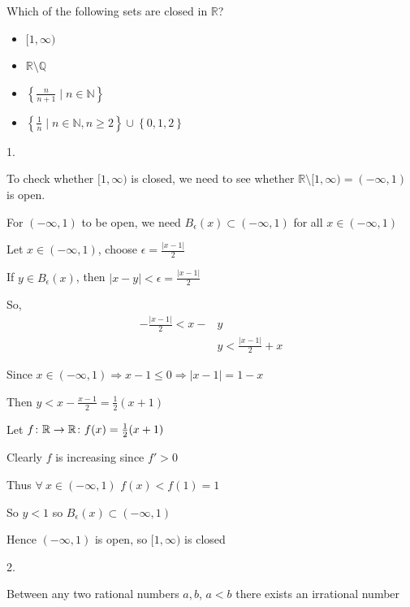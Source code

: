 \documentclass{article}
\begin{document}
\begin{problem}
Which of the following sets are closed in \( \mathbb{R} \)?
\begin{itemize}
	\item \( [1,\infty) \)
	\item \( \mathbb{R} \setminus \mathbb{Q} \)
	\item \( \left\{ \frac{n}{n+1} \mid n \in \mathbb{N} \right\}  \)
	\item \( \left\{ \frac{1}{n} \mid n \in \mathbb{N}, n \ge 2 \right\} \cup \left\{ 0,1,2 \right\}  \)
\end{itemize}

\begin{solution}1.

	To check whether \( [1,\infty) \) is closed, we need to see whether \( \mathbb{R}\setminus [1,\infty) = (-\infty,1) \) is open.


	For \( (-\infty,1) \) to be open, we need \( B_{\epsilon}(x) \subset (-\infty,1) \) for all \( x \in (-\infty,1) \)

	Let \( x \in (-\infty,1) \), choose \( \epsilon = \frac{|x-1|}{2} \)

	If \( y \in B_{\epsilon}(x) \), then \( |x-y| < \epsilon = \frac{|x-1|}{2} \)

	So,
	\begin{align*}
		-\frac{|x-1|}{2} < x- & y                       \\
		                      & y < \frac{|x-1|}{2} + x
	\end{align*}

	Since \( x \in (-\infty,1) \Rightarrow x-1 \le 0 \Rightarrow |x-1| = 1 - x\)

	Then \( y < x - \frac{x-1}{2} = \frac{1}{2}(x + 1) \)

	Let \( f \colon \mathbb{R} \to \mathbb{R} \colon f(x) = \frac{1}{2}(x+1)  \)

	Clearly \( f \) is increasing since \( f' > 0 \)

	Thus \( \forall \ x \in (-\infty,1) \) \( f(x) < f(1) = 1 \)

	So \( y < 1 \) so \( B_{\epsilon}(x) \subset (-\infty,1)\)

	Hence \( (-\infty,1) \) is open, so \( [1,\infty) \) is closed
\end{solution}

\begin{solution} 2.

	\begin{lemma}
		Between any two rational numbers \( a, b \), \( a < b \) there exists an irrational number


\end{lemma}
\end{solution}
\end{problem}
\end{document}
